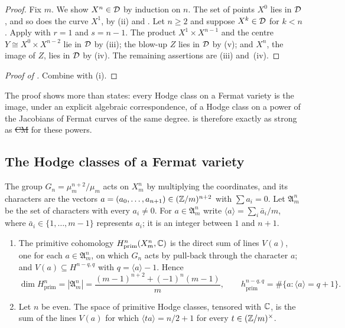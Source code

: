 \begin{proof}
Fix $m$. We show $X^{n}\in\mathcal{D}$ by induction on $n$. The set of points
$X^{0}$ lies in $\mathcal{D}$, and so does the curve $X^{1}$, by
(ii) and . Let $n\ge2$ and suppose
$X^{k}\in\mathcal{D}$ for $k<n$. Apply  with $r=1$ and $s=n-1$. The
product $X^{1}\times X^{n-1}$ and the centre $Y\cong X^{0}\times X^{n-2}$ lie
in $\mathcal{D}$ by (iii); the blow-up $Z$ lies in $\mathcal{D}$ by
(v); and $X^{n}$, the image of $Z$, lies in $\mathcal{D}$ by
(iv). The remaining assertions are
(iii) and~(iv).
\end{proof}

\begin{proof}[Proof of ]
Combine  with (i).
\end{proof}

The proof shows more than  states: every Hodge class on a
Fermat variety is the image, under an explicit algebraic correspondence, of a
Hodge class on a power of the Jacobians of Fermat curves of the same degree.
 is therefore exactly as strong as \st{CM} for these powers.

\subsection{The Hodge classes of a Fermat variety}\label{ssec:fermathodge}

The group $G_{n}=\mu_{m}^{n+2}/\mu_{m}$ acts on $X^{n}_{m}$ by multiplying
the coordinates, and its characters are the vectors
$a=(a_{0},\dots,a_{n+1})\in(\mathbb{Z}/m)^{n+2}$ with $\sum a_{i}=0$. Let
$\mathfrak{A}^{n}_{m}$ be the set of characters with every $a_{i}\ne0$. For
$a\in\mathfrak{A}^{n}_{m}$ write $\langle a\rangle=\sum_{i}\bar a_{i}/m$,
where $\bar a_{i}\in\{1,\dots,m-1\}$ represents $a_{i}$; it is an integer
between $1$ and $n+1$.

\begin{proposition}\label{prop:fermatchars}
\begin{enumerate}[label=\textup{(\roman*)}]
\item The primitive cohomology $H^{n}_{\mathrm{prim}}(X^{n}_{m},\mathbb{C})$ is the
direct sum of lines $V(a)$, one for each $a\in\mathfrak{A}^{n}_{m}$, on which
$G_{n}$ acts by pull-back through the character $a$; and $V(a)\subseteq H^{n-q,q}$ with $q=\langle
a\rangle-1$. Hence
\[
  \dim H^{n}_{\mathrm{prim}}=|\mathfrak{A}^{n}_{m}|
  =\frac{(m-1)^{n+2}+(-1)^{n}(m-1)}{m},\qquad
  h^{n-q,q}_{\mathrm{prim}}=\#\{a:\langle a\rangle=q+1\}.
\]
\item Let $n$ be even. The space of primitive Hodge classes, tensored with
$\mathbb{C}$, is the sum of the lines $V(a)$ for which $\langle ta\rangle=n/2+1$ for
every $t\in(\mathbb{Z}/m)^{\times}$.
\end{enumerate}
\end{proposition}

